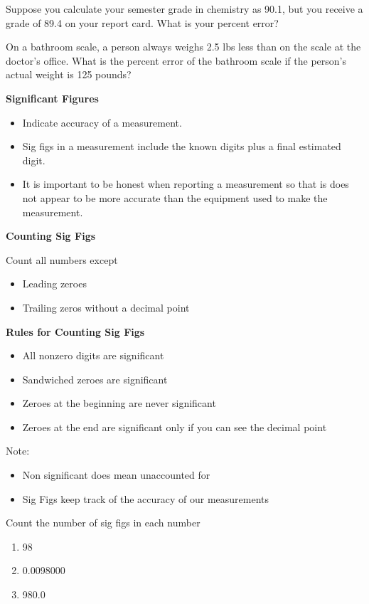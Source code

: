 \documentclass[../hchem.tex]{subfiles}
\begin{document}
\ex Suppose you calculate your semester grade in chemistry as 90.1, but you receive a grade 
of 89.4 on your report card. What is your percent error? 

\ex On a bathroom scale, a person always weighs 2.5 lbs less than on the scale at the doctor's office. What is the 
percent error of the bathroom scale if the person's actual weight is 125 pounds?

\textbf{Significant Figures}
\begin{itemize}
    \item Indicate accuracy of a measurement.
    \item Sig figs in a measurement include the known digits plus a final estimated digit.
    \item It is important to be honest when reporting a measurement so that is does not appear to be more accurate than the equipment used to make the measurement.
\end{itemize}

\textbf{Counting Sig Figs}

Count all numbers except
\begin{itemize}
    \item Leading zeroes 
    \item Trailing zeros without a decimal point 
\end{itemize}

\textbf{Rules for Counting Sig Figs}
\begin{itemize}
    \item All nonzero digits are significant 
    \item Sandwiched zeroes are significant 
    \item Zeroes at the beginning are never significant
    \item Zeroes at the end are significant only if you can see the decimal point 
\end{itemize}
Note:
\begin{itemize}
    \item Non significant does mean unaccounted for 
    \item Sig Figs keep track of the accuracy of our measurements 
\end{itemize}

\ex Count the number of sig figs in each number 
\begin{enumerate}
    \item 98
    \item 0.0098000
    \item 980.0
\end{enumerate}
\end{document}

